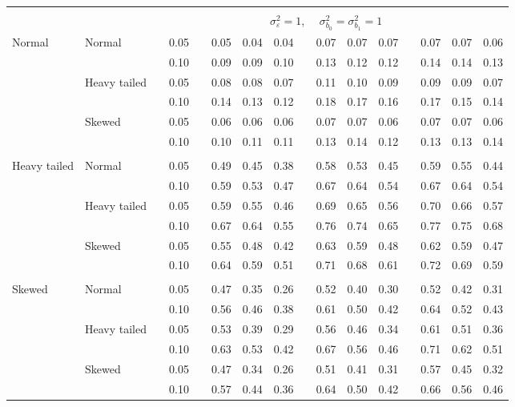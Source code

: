\documentclass{article} %
\begin{document}
\begin{table}[ht]
\begin{scriptsize}
\begin{center}
\begin{tabular}{ll p{.1cm} c p{.1cm} rrr p{.1cm} rrr p{.1cm} rrr}
&&&&&&&&&&&&&&&\\
& && && \multicolumn{9}{c}{$\sigma_{\varepsilon}^2 = 1$, \ \ $\sigma_{b_0}^2 = \sigma_{b_1}^2 = 1$} \\ \cline{6-16}
\rowcolor{gray!20}Normal       & Normal       && 0.05 &&   0.05 & 0.04 & 0.04 && 0.07 & 0.07 & 0.07 && 0.07 & 0.07 & 0.06 \\  
\rowcolor{gray!20}             &              && 0.10 &&   0.09 & 0.09 & 0.10 && 0.13 & 0.12 & 0.12 && 0.14 & 0.14 & 0.13 \\  
\rowcolor{gray!20}             & Heavy tailed && 0.05 &&   0.08 & 0.08 & 0.07 && 0.11 & 0.10 & 0.09 && 0.09 & 0.09 & 0.07 \\  
\rowcolor{gray!20}             &              && 0.10 &&   0.14 & 0.13 & 0.12 && 0.18 & 0.17 & 0.16 && 0.17 & 0.15 & 0.14 \\  
\rowcolor{gray!20}             & Skewed       && 0.05 &&   0.06 & 0.06 & 0.06 && 0.07 & 0.07 & 0.06 && 0.07 & 0.07 & 0.06 \\  
\rowcolor{gray!20}             &              && 0.10 &&   0.10 & 0.11 & 0.11 && 0.13 & 0.14 & 0.12 && 0.13 & 0.13 & 0.14 \\  
             &&&&&&&&&&&&&&&\\
Heavy tailed & Normal       && 0.05 &&   0.49 & 0.45 & 0.38 && 0.58 & 0.53 & 0.45 && 0.59 & 0.55 & 0.44 \\ 
             &              && 0.10 &&   0.59 & 0.53 & 0.47 && 0.67 & 0.64 & 0.54 && 0.67 & 0.64 & 0.54 \\ 
             & Heavy tailed && 0.05 &&   0.59 & 0.55 & 0.46 && 0.69 & 0.65 & 0.56 && 0.70 & 0.66 & 0.57 \\ 
             &              && 0.10 &&   0.67 & 0.64 & 0.55 && 0.76 & 0.74 & 0.65 && 0.77 & 0.75 & 0.68 \\ 
             & Skewed       && 0.05 &&   0.55 & 0.48 & 0.42 && 0.63 & 0.59 & 0.48 && 0.62 & 0.59 & 0.47 \\ 
             &              && 0.10 &&   0.64 & 0.59 & 0.51 && 0.71 & 0.68 & 0.61 && 0.72 & 0.69 & 0.59 \\ 
             &&&&&&&&&&&&&&&\\
Skewed       & Normal       && 0.05 &&   0.47 & 0.35 & 0.26 && 0.52 & 0.40 & 0.30 && 0.52 & 0.42 & 0.31 \\
             &              && 0.10 &&   0.56 & 0.46 & 0.38 && 0.61 & 0.50 & 0.42 && 0.64 & 0.52 & 0.43 \\
             & Heavy tailed && 0.05 &&   0.53 & 0.39 & 0.29 && 0.56 & 0.46 & 0.34 && 0.61 & 0.51 & 0.36 \\
             &              && 0.10 &&   0.63 & 0.53 & 0.42 && 0.67 & 0.56 & 0.46 && 0.71 & 0.62 & 0.51 \\
             & Skewed       && 0.05 &&   0.47 & 0.34 & 0.26 && 0.51 & 0.41 & 0.31 && 0.57 & 0.45 & 0.32 \\
             &              && 0.10 &&   0.57 & 0.44 & 0.36 && 0.64 & 0.50 & 0.42 && 0.66 & 0.56 & 0.46 \\



\end{tabular}
\end{center}
\end{scriptsize}
\end{table}
\end{document}
